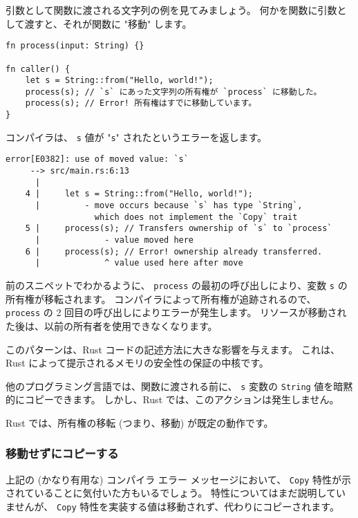 引数として関数に渡される文字列の例を見てみましょう。 何かを関数に引数として渡すと、それが関数に "移動" します。

\begin{lstlisting}[numbers=none]
fn process(input: String) {}

fn caller() {
    let s = String::from("Hello, world!");
    process(s); // `s` にあった文字列の所有権が `process` に移動した。
    process(s); // Error! 所有権はすでに移動しています。
}
\end{lstlisting}

コンパイラは、 \texttt{s} 値が "\texttt{s}" されたというエラーを返します。

\begin{lstlisting}[numbers=none]
    error[E0382]: use of moved value: `s`
     --> src/main.rs:6:13
      |
    4 |     let s = String::from("Hello, world!");
      |         - move occurs because `s` has type `String`,
                  which does not implement the `Copy` trait
    5 |     process(s); // Transfers ownership of `s` to `process`
      |             - value moved here
    6 |     process(s); // Error! ownership already transferred.
      |             ^ value used here after move
\end{lstlisting}

前のスニペットでわかるように、 \texttt{process} の最初の呼び出しにより、変数 \texttt{s} の所有権が移転されます。 コンパイラによって所有権が追跡されるので、 \texttt{process} の 2 回目の呼び出しによりエラーが発生します。 リソースが移動された後は、以前の所有者を使用できなくなります。

このパターンは、Rust コードの記述方法に大きな影響を与えます。 これは、Rust によって提示されるメモリの安全性の保証の中核です。

他のプログラミング言語では、関数に渡される前に、 \texttt{s} 変数の \texttt{String} 値を暗黙的にコピーできます。 しかし、Rust では、このアクションは発生しません。

Rust では、所有権の移転 (つまり、移動) が既定の動作です。

\subsubsection{移動せずにコピーする}

上記の (かなり有用な) コンパイラ エラー メッセージにおいて、 \texttt{Copy} 特性が示されていることに気付いた方もいるでしょう。 特性についてはまだ説明していませんが、 \texttt{Copy} 特性を実装する値は移動されず、代わりにコピーされます。

